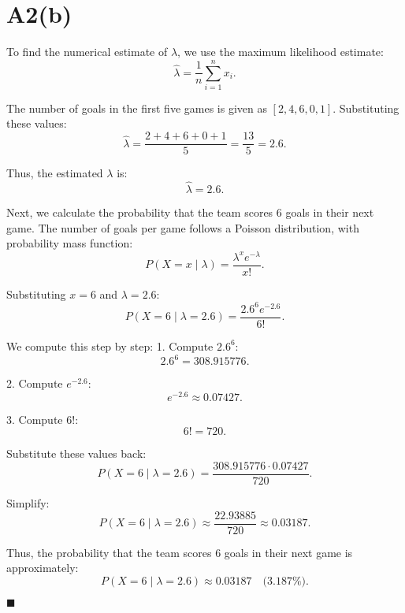\documentclass{article}
\begin{document}
\section*{A2(b)}

To find the numerical estimate of \( \lambda \), we use the maximum likelihood estimate:
\[
\hat{\lambda} = \frac{1}{n} \sum_{i=1}^n x_i.
\]

The number of goals in the first five games is given as \( [2, 4, 6, 0, 1] \). Substituting these values:
\[
\hat{\lambda} = \frac{2 + 4 + 6 + 0 + 1}{5} = \frac{13}{5} = 2.6.
\]

Thus, the estimated \( \lambda \) is:
\[
\hat{\lambda} = 2.6.
\]

Next, we calculate the probability that the team scores 6 goals in their next game. The number of goals per game follows a Poisson distribution, with probability mass function:
\[
P(X = x \mid \lambda) = \frac{\lambda^x e^{-\lambda}}{x!}.
\]

Substituting \( x = 6 \) and \( \lambda = 2.6 \):
\[
P(X = 6 \mid \lambda = 2.6) = \frac{2.6^6 e^{-2.6}}{6!}.
\]

We compute this step by step:
1. Compute \( 2.6^6 \):
\[
2.6^6 = 308.915776.
\]

2. Compute \( e^{-2.6} \):
\[
e^{-2.6} \approx 0.07427.
\]

3. Compute \( 6! \):
\[
6! = 720.
\]

Substitute these values back:
\[
P(X = 6 \mid \lambda = 2.6) = \frac{308.915776 \cdot 0.07427}{720}.
\]

Simplify:
\[
P(X = 6 \mid \lambda = 2.6) \approx \frac{22.93885}{720} \approx 0.03187.
\]

Thus, the probability that the team scores 6 goals in their next game is approximately:
\[
P(X = 6 \mid \lambda = 2.6) \approx 0.03187 \quad \text{(3.187\%)}.
\]

\hfill\(\blacksquare\)
\end{document}
